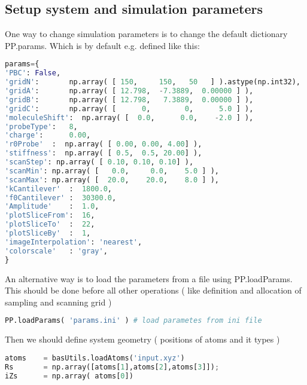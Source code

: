 \subsection{Setup system and simulation parameters}

One way to change simulation parameters is to change the default dictionary
PP.params. Which is by default e.g. defined like this:


\begin{shadedbox}
    \begin{lstlisting}[language=python]
params={
'PBC': False,
'gridN':       np.array( [ 150,     150,   50   ] ).astype(np.int32),
'gridA':       np.array( [ 12.798,  -7.3889,  0.00000 ] ),
'gridB':       np.array( [ 12.798,   7.3889,  0.00000 ] ),
'gridC':       np.array( [      0,        0,      5.0 ] ),
'moleculeShift':  np.array( [  0.0,      0.0,    -2.0 ] ),
'probeType':   8,
'charge':      0.00,
'r0Probe'  :  np.array( [ 0.00, 0.00, 4.00] ),
'stiffness':  np.array( [ 0.5,  0.5, 20.00] ),
'scanStep': np.array( [ 0.10, 0.10, 0.10] ),
'scanMin': np.array( [   0.0,     0.0,    5.0 ] ),
'scanMax': np.array( [  20.0,    20.0,    8.0 ] ),
'kCantilever'  :  1800.0, 
'f0Cantilever' :  30300.0,
'Amplitude'    :  1.0,
'plotSliceFrom':  16,
'plotSliceTo'  :  22,
'plotSliceBy'  :  1,
'imageInterpolation': 'nearest',
'colorscale'   : 'gray',
}
   \end{lstlisting}
\end{shadedbox}

An alternative way is to load the parameters from a file using PP.loadParams.
This should be done before all other operations ( like definition and allocation
of sampling and scanning grid )




\begin{shadedbox}
    \begin{lstlisting}[language=python]
PP.loadParams( 'params.ini' ) # load parametes from ini file
   \end{lstlisting}
\end{shadedbox}


Then we should define system geometry ( positions of atoms and it types )
\begin{shadedbox}
    \begin{lstlisting}[language=python]
atoms    = basUtils.loadAtoms('input.xyz')
Rs       = np.array([atoms[1],atoms[2],atoms[3]]);  
iZs      = np.array( atoms[0])
   \end{lstlisting}
\end{shadedbox}




